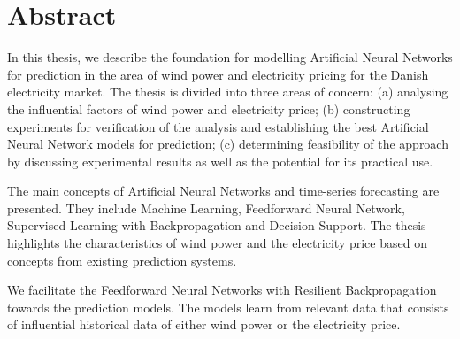 \documentclass[twoside,11pt,openright]{report}
\begin{document}
	
\pagestyle{empty} 
\vspace*{\fill}
\clearpage


\pagestyle{plain}
\chapter*{Abstract}

In this thesis, we describe the foundation for modelling Artificial Neural Networks for prediction in the area of wind power and electricity pricing for the Danish electricity market. The thesis is divided into three areas of concern: (a) analysing the influential factors of wind power and electricity price; (b) constructing experiments for verification of the analysis and establishing the best Artificial Neural Network models for prediction; (c) determining feasibility of the approach by discussing experimental results as well as the potential for its practical use.

The main concepts of Artificial Neural Networks and time-series forecasting are presented. They include Machine Learning, Feedforward Neural Network, Supervised Learning with Backpropagation and Decision Support. The thesis highlights the characteristics of wind power and the electricity price based on concepts from existing prediction systems. 

We facilitate the Feedforward Neural Networks with Resilient Backpropagation towards the prediction models. The models learn from relevant data that consists of influential historical data of either wind power or the electricity price.
\end{document}
